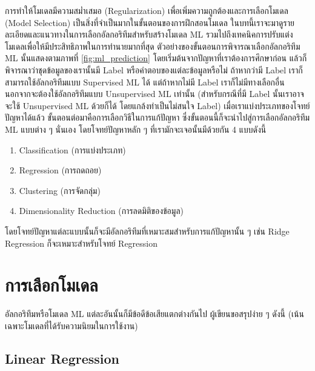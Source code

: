 การทำให้โมเดลมีความสม่ำเสมอ (Regularization) เพื่อเพิ่มความถูกต้องและการเลือกโมเดล (Model Selection) เป็นสิ่งที่จำเป็นมากในขั้นตอนของการฝึกสอนโมเดล ในบทนี้เราจะมาดูรายละเอียดและแนวทางในการเลือกอัลกอริทึมสำหรับสร้างโมเดล ML รวมไปถึงเทคนิคการปรับแต่งโมเดลเพื่อให้มีประสิทธิภาพในการทำนายมากที่สุด ตัวอย่างของขั้นตอนการพิจารณาเลือกอัลกอริทึม ML นั้นแสดงตามภาพที่ \ref{fig:ml_prediction}
โดยเริ่มต้นจากปัญหาที่เราต้องการศึกษาก่อน แล้วก็พิจารณาว่าชุดข้อมูลของเรานั้นมี Label หรือคำตอบของแต่ละข้อมูลหรือไม่ ถ้าหากว่ามี Label 
เราก็สามารถใช้อัลกอริทึมแบบ Supervised ML ได้ แต่ถ้าหากไม่มี Label เราก็ไม่มีทางเลือกอื่นนอกจากจะต้องใช้อัลกอริทึมแบบ Unsupervised 
ML เท่านั้น (สำหรับกรณีที่มี Label นั้นเราอาจจะใช้ Unsupervised ML ด้วยก็ได้ โดยแกล้งทำเป็นไม่สนใจ Label) เมื่อเราแบ่งประเภทของโจทย์ปัญหาได้แล้ว ขั้นตอนต่อมาคือการเลือกวิธีในการแก้ปัญหา ซึ่งขั้นตอนนี้ก็จะนำไปสู่การเลือกอัลกอริทึม ML แบบต่าง ๆ นั่นเอง โดยโจทย์ปัญหาหลัก ๆ ที่เรามักจะเจอนั้นมีด้วยกัน 4 แบบดังนี้
%
\begin{enumerate}[topsep=0pt,noitemsep]\setlength\itemsep{0.5em}
    \item Classification (การแบ่งประเภท)
    
    \item Regression (การถดถอย)
    
    \item Clustering (การจัดกลุ่ม)
    
    \item Dimensionality Reduction (การลดมิติของข้อมูล)
\end{enumerate}

โดยโจทย์ปัญหาแต่ละแบบนั้นก็จะมีอัลกอริทึมที่เหมาะสมสำหรับการแก้ปัญหานั้น ๆ เช่น Ridge Regression ก็จะเหมาะสำหรับโจทย์ Regression

\section{การเลือกโมเดล}
\label{sec:choose_model}

อัลกอริทึมหรือโมเดล ML แต่ละอันนั้นก็มีข้อดีข้อเสียแตกต่างกันไป ผู้เขียนขอสรุปง่าย ๆ ดังนี้ (เน้นเฉพาะโมเดลที่ได้รับความนิยมในการใช้งาน)

\subsection{Linear Regression}
\label{ssec:pros_cons_lin_reg}


